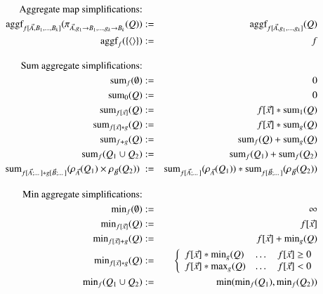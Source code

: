 \documentclass{article}
\newcommand{\tuple}[1]{{\langle#1\rangle}}
\begin{document}
%
\begin{figure*}
\begin{eqnarray}
\nonumber
\mbox{Aggregate map simplifications:} &&
\\
\label{eq:ags1}
\algaggf_{f[\vec{A}, B_1, \dots, B_k]}
   (\pi_{\vec{A}, g_1 \rightarrow B_1, \dots, g_k \rightarrow B_k}(Q))
&:=&
\algaggf_{f[\vec{A}, g_1, \dots, g_k]}(Q)
\\
\label{eq:ags2}
\algaggf_f(\{\tuple{}\}) &:=& f
%
%
\\[2ex]
\mbox{Sum aggregate simplifications:} && \nonumber\\
\label{eq:sum1}
\algsum_f(\emptyset) &:=& 0
\\
\label{eq:sum2}
\algsum_{0}(Q) &:=& 0
\\
\label{eq:sum3}
\algsum_{f[\vec{x}]}(Q) &:=& f[\vec{x}] * \algsum_1(Q)
\\
\label{eq:sum4}
\algsum_{f[\vec{x}]*g}(Q) &:=& f[\vec{x}] * \algsum_{g}(Q)
\\
\label{eq:sum5}
\algsum_{f+g}(Q) &:=& \algsum_f(Q) + \algsum_g(Q)
\\
\label{eq:sum6}
\algsum_f(Q_1 \cup Q_2) &:=& \algsum_f(Q_1) + \algsum_f(Q_2)
\\
\label{eq:sum7}
\algsum_{f[\vec{A};\dots] * g[\vec{B};\dots]}(\rho_{\vec{A}}(Q_1) \times \rho_{\vec{B}}(Q_2)) \; &:=&
\algsum_{f[\vec{A};\dots]}(\rho_{\vec{A}}(Q_1))
    * \algsum_{f[\vec{B};\dots]}(\rho_{\vec{B}}(Q_2))
%
%
\\[2ex]
\mbox{Min aggregate simplifications:} && \nonumber\\
\label{eq:min1}
\algmin_{f}(\emptyset) &:=& \infty
\\
\label{eq:min2}
\algmin_{f[\vec{x}]}(Q) &:=& f[\vec{x}]
\\
\label{eq:min3}
\algmin_{f[\vec{x}]+g}(Q) &:=& f[\vec{x}] + \algmin_{g}(Q)
\\
\label{eq:min4}
\algmin_{f[\vec{x}]*g}(Q) &:=&
\left\{
\begin{array}{lll}
f[\vec{x}] * \algmin_{g}(Q) & \dots & f[\vec{x}] \geq 0 \\
f[\vec{x}] * \algmax_{g}(Q) & \dots & f[\vec{x}] < 0
\end{array}
\right.
\\
\label{eq:min5}
\algmin_{f}(Q_1 \cup Q_2) &:=& \min(\algmin_f (Q_1), \algmin_f (Q_2))

\end{eqnarray}
\end{figure*}
\end{document}
